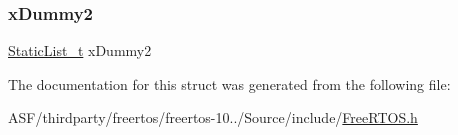 \subsubsection{\texorpdfstring{xDummy2}{xDummy2}}
{\footnotesize\ttfamily \mbox{\hyperlink{_free_r_t_o_s_8h_a9735ad9101a2bd25f83a62089a4acee6}{Static\+List\+\_\+t}} x\+Dummy2}



The documentation for this struct was generated from the following file\+:\begin{DoxyCompactItemize}
\item 
A\+S\+F/thirdparty/freertos/freertos-\/10../\+Source/include/\mbox{\hyperlink{_free_r_t_o_s_8h}{Free\+R\+T\+O\+S.\+h}}\end{DoxyCompactItemize}
